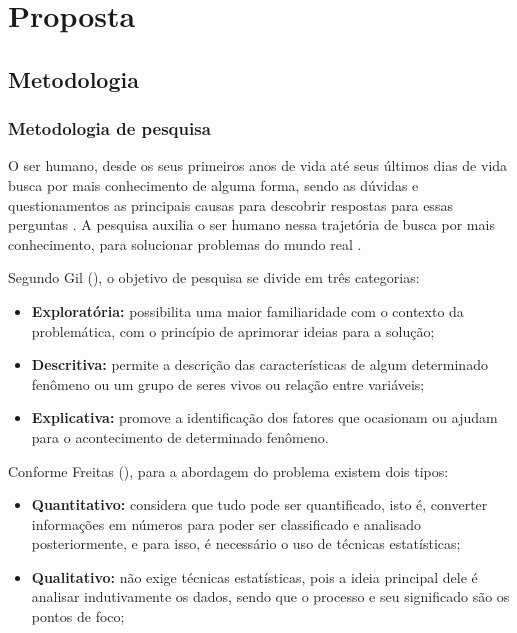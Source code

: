 \chapter{Proposta}
\label{proposta}
\section{Metodologia}

\subsection{Metodologia de pesquisa}

O ser humano, desde os seus primeiros anos de vida até seus últimos dias de vida busca por mais conhecimento de alguma forma, sendo as dúvidas e questionamentos as principais causas para descobrir respostas para essas perguntas \cite{Paschoarelli_Medola_Bonfim_2018}. A pesquisa auxilia o ser humano nessa trajetória de busca por mais conhecimento, para solucionar problemas do mundo real \cite{gil:2008}.

Segundo Gil (\citeyear{gil:2002}), o objetivo de pesquisa se divide em três categorias:

\begin{itemize}
    \item \textbf{Exploratória:} possibilita uma maior familiaridade com o contexto da problemática, com o princípio de aprimorar ideias para a solução;
    
    \item \textbf{Descritiva:} permite a descrição das características de algum determinado fenômeno ou um grupo 
    de seres vivos ou relação entre variáveis;
    
    \item \textbf{Explicativa:} promove a identificação dos fatores que ocasionam ou ajudam para o acontecimento de determinado fenômeno.

\end{itemize}

Conforme Freitas (\citeyear{de2013metodologia}), para a abordagem do problema existem dois tipos:

\begin{itemize}
    \item \textbf{Quantitativo:} considera que tudo pode ser quantificado, isto é, converter informações em números para poder ser classificado e analisado posteriormente, e para isso, é necessário o uso de técnicas estatísticas;
    
    \item \textbf{Qualitativo:} não exige técnicas estatísticas, pois a ideia principal dele é analisar indutivamente os dados, sendo que o processo e seu significado são os pontos de foco;
\end{itemize}


